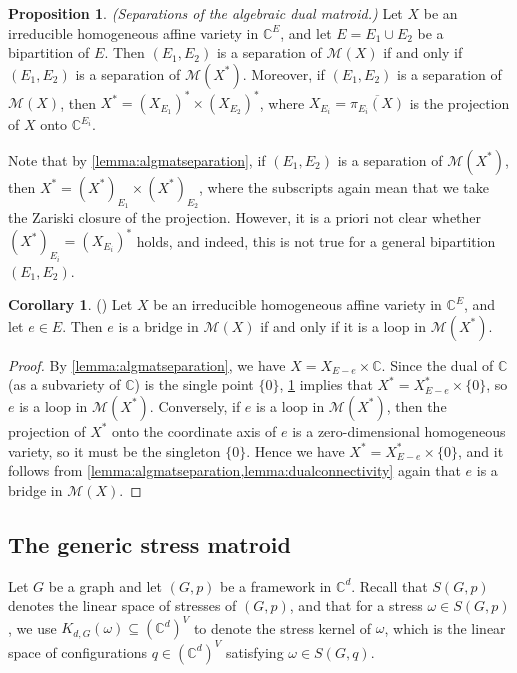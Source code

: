 \documentclass[11pt,a4paper,dvipsnames]{scrartcl}
\theoremstyle{definition}
\newtheorem{corollary}[theorem]{Corollary}
\newtheorem{proposition}[theorem]{Proposition}
\newcommand{\CC}{\mathbb{C}}
\newcommand{\algmat}[1]{\mathcal{M}(#1)}
\newcommand{\stresskernel}[2]{K_{{#1},{#2}}}
\begin{document}
\begin{proposition}\label{lemma:dualconnectivity}\emph{(Separations of the algebraic dual matroid.)}\newline
    Let $X$ be an irreducible homogeneous affine variety in $\CC^E$, and let $E = E_1 \cup E_2$ be a bipartition of $E$. Then $(E_1,E_2)$ is a separation of $\algmat{X}$ if and only if $(E_1,E_2)$ is a separation of $\algmat{X^*}$. Moreover, if $(E_1,E_2)$ is a separation of $\algmat{X}$, then $X^* = {(X_{E_1})}^* \times {(X_{E_2})}^*$, where $X_{E_i} = \overline{\pi_{E_i}(X)}$ is the projection of $X$ onto $\CC^{E_i}$.
\end{proposition}
\noindent Note that by \cref{lemma:algmatseparation}, if $(E_1,E_2)$ is a separation of $\algmat{X^*}$, then $X^* = {(X^*)}_{E_1} \times {(X^*)}_{E_2}$, where the subscripts again mean that we take the Zariski closure of the projection. However, it is a priori not clear whether ${(X^*)}_{E_i} = {(X_{E_i})}^*$ holds, and indeed, this is not true for a general bipartition $(E_1,E_2)$.

\begin{corollary}\label{corollary:degeneratedual} (\cite[Section 2.2.6]{fischer.piontkowski_2001})
    Let $X$ be an irreducible homogeneous affine variety in $\CC^E$, and let $e \in E$. Then $e$ is a bridge in $\algmat{X}$ if and only if it is a loop in $\algmat{X^*}$.
\end{corollary}
\begin{proof}
    By \cref{lemma:algmatseparation}, we have $X = X_{E-e} \times \CC$. Since the dual of $\CC$ (as a subvariety of $\CC$) is the single point $\{0\}$, \cref{lemma:dualconnectivity} implies that $X^* = X^*_{E-e} \times \{0\}$,  so $e$ is a loop in $\algmat{X^*}$. Conversely, if $e$ is a loop in $\algmat{X^*}$, then the projection of $X^*$ onto the coordinate axis of $e$ is a zero-dimensional homogeneous variety, so it must be the singleton $\{0\}$. Hence we have $X^* = X^*_{E-e} \times \{0\}$, and it follows from \cref{lemma:algmatseparation,lemma:dualconnectivity} again that $e$ is a bridge in $\algmat{X}$.
\end{proof}




\subsection{The generic stress matroid}\label{subsection:stressmatroid}

Let $G$ be a graph and let $(G,p)$ be a framework in $\CC^d$. Recall that $S(G,p)$ denotes the linear space of stresses of $(G,p)$, and that for a stress $\omega \in S(G,p)$, we use  $\stresskernel{d}{G}(\omega) \subseteq (\CC^{d})^V$ to denote the stress kernel of $\omega$, which is the linear space of configurations $q \in (\CC^d)^V$ satisfying $\omega \in S(G,q)$. %
\end{document}
